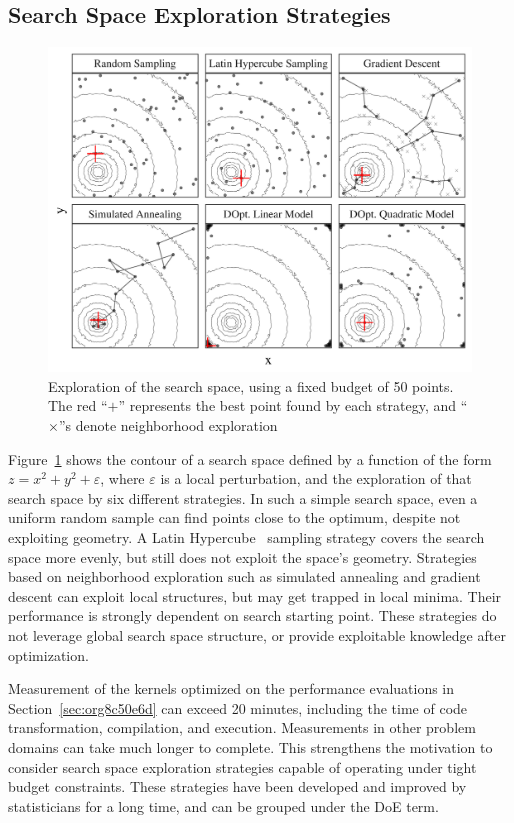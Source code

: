 \documentclass[conference]{IEEEtran}
\begin{document}
\subsection{Search Space Exploration Strategies}
\label{sec:org76925f5}
\begin{figure}[b]
\centering
\includegraphics[width=.95\columnwidth]{./img/sampling_comparison.pdf}
\caption{\label{fig:org04e487a}
Exploration of the search space, using a fixed budget of 50 points. The red ``\(+\)'' represents the best point found by each strategy, and ``\(\times\)''s denote neighborhood exploration}
\end{figure}

Figure~\ref{fig:org04e487a} shows the contour of a search space defined
by a function of the form \(z = x^2 + y^2 + \varepsilon\), where \(\varepsilon\) is
a local perturbation, and the exploration of that search space by six different
strategies. In such a simple search space, even a uniform random sample can find
points close to the optimum, despite not exploiting geometry. A Latin
Hypercube~\cite{carnell2018lhs} sampling strategy covers the search space
more evenly, but still does not exploit the space's geometry. Strategies based on
neighborhood exploration such as simulated annealing and gradient descent can
exploit local structures, but may get trapped in local minima. Their
performance is strongly dependent on search starting point. These strategies do
not leverage global search space structure, or provide exploitable knowledge
after optimization.

Measurement of the kernels optimized on the performance evaluations in
Section~\ref{sec:org8c50e6d} can exceed 20 minutes, including the time
of code transformation, compilation, and execution. Measurements in other
problem domains can take much longer to complete. This strengthens the
motivation to consider search space exploration strategies capable of operating
under tight budget constraints. These strategies have been developed and
improved by statisticians for a long time, and can be grouped under the DoE
term.
\end{document}
